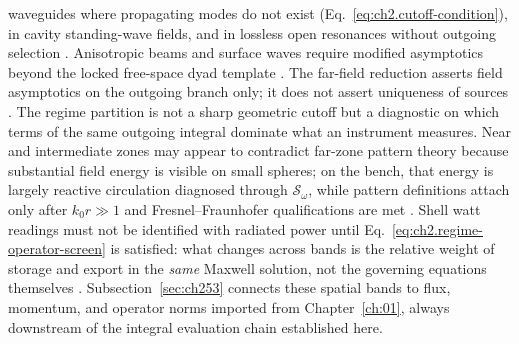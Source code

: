 waveguides where propagating modes do not exist
(Eq.~\eqref{eq:ch2.cutoff-condition}), in cavity standing-wave fields, and in lossless open
resonances without outgoing selection \cite{stratton1941}. Anisotropic beams and surface
waves require modified asymptotics beyond the locked free-space dyad template
\cite{harrington2001}. The far-field reduction asserts field asymptotics on the outgoing
branch only; it does not assert uniqueness of sources \cite{stratton1941}.
The regime partition is not a sharp geometric cutoff but a diagnostic on which terms of the same outgoing integral dominate what an instrument measures. Near and intermediate zones may appear to contradict far-zone pattern theory because substantial field energy is visible on small spheres; on the bench, that energy is largely reactive circulation diagnosed through $\mathcal{S}_\omega$, while pattern definitions attach only after $k_0 r\gg 1$ and Fresnel--Fraunhofer qualifications are met \cite{harrington2001}. Shell watt readings must not be identified with radiated power until Eq.~\eqref{eq:ch2.regime-operator-screen} is satisfied: what changes across bands is the relative weight of storage and export in the \emph{same} Maxwell solution, not the governing equations themselves \cite{poynting1884}. Subsection~\ref{sec:ch253} connects these spatial bands to flux, momentum, and operator norms imported from Chapter~\ref{ch:01}, always downstream of the integral evaluation chain established here.

